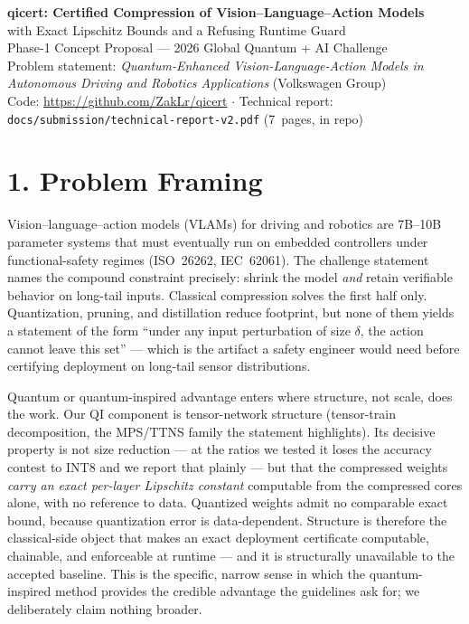 \documentclass[10pt]{article}
\begin{document}
\begin{center}
{\LARGE\bfseries qicert: Certified Compression of Vision--Language--Action Models}\\[2pt]
{\large with Exact Lipschitz Bounds and a Refusing Runtime Guard}\\[6pt]
Phase-1 Concept Proposal --- 2026 Global Quantum + AI Challenge\\
Problem statement: \emph{Quantum-Enhanced Vision-Language-Action Models in
Autonomous Driving and Robotics Applications} (Volkswagen Group)\\
Code: \url{https://github.com/ZakLr/qicert} \quad$\cdot$\quad
Technical report: \texttt{docs/submission/technical-report-v2.pdf} (7~pages, in repo)
\end{center}

\section*{1. Problem Framing}
Vision--language--action models (VLAMs) for driving and robotics are 7B--10B
parameter systems that must eventually run on embedded controllers under
functional-safety regimes (ISO~26262, IEC~62061). The challenge statement
names the compound constraint precisely: shrink the model \emph{and} retain
verifiable behavior on long-tail inputs. Classical compression solves the
first half only. Quantization, pruning, and distillation reduce footprint, but
none of them yields a statement of the form ``under any input perturbation of
size $\delta$, the action cannot leave this set'' --- which is the artifact a
safety engineer would need before certifying deployment on long-tail sensor
distributions.

Quantum or quantum-inspired advantage enters where structure, not scale, does
the work. Our QI component is tensor-network structure (tensor-train
decomposition, the MPS/TTNS family the statement highlights). Its decisive
property is not size reduction --- at the ratios we tested it loses the
accuracy contest to INT8 and we report that plainly --- but that the
compressed weights \emph{carry an exact per-layer Lipschitz constant}
computable from the compressed cores alone, with no reference to data.
Quantized weights admit no comparable exact bound, because quantization error
is data-dependent. Structure is therefore the classical-side object that makes
an exact deployment certificate computable, chainable, and enforceable at
runtime --- and it is structurally unavailable to the accepted baseline. This
is the specific, narrow sense in which the quantum-inspired method provides
the credible advantage the guidelines ask for; we deliberately claim nothing
broader.
\end{document}
